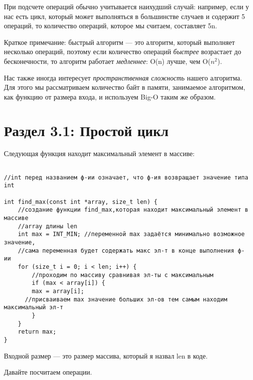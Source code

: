 \vspace{\baselineskip}
При подсчете операций обычно учитывается наихудший случай: например, если у нас есть цикл, который может выполняться в большинстве случаев и содержит 5 операций, то количество операций, которое мы считаем, составляет 5n. 

\vspace{\baselineskip}
Краткое примечание: быстрый алгоритм --- это алгоритм, который выполняет несколько операций, поэтому если количество операций \textit{быстрее} возрастает до бесконечности, то алгоритм работает \textit{медленнее}: O(n) лучше, чем O($n^{2}$).

\vspace{\baselineskip}
Нас также иногда интересует \textit{пространственная сложность} нашего алгоритма. Для этого мы рассматриваем количество байт в памяти, занимаемое алгоритмом, как функцию от размера входа, и используем Big-O таким же образом.


\section*{Раздел 3.1: Простой цикл}

Следующая функция находит максимальный элемент в массиве:

\vspace{\baselineskip}
\begin{tcolorbox}
\begin{verbatim}

//int перед названием ф-ии означает, что ф-ия возвращает значение типа int

int find_max(const int *array, size_t len) { 
	//создание функции find_max,которая находит максимальный элемент в массиве 
	//array длины len
	int max = INT_MIN; //переменной max задаётся минимально возможное значение,
	//сама переменная будет содержать макс эл-т в конце выполнения ф-ии
	for (size_t i = 0; i < len; i++) {
		//проходим по массиву сравнивая эл-ты с максимальным
		if (max < array[i]) {
		max = array[i];
	  //присваиваем max значение больших эл-ов тем самым находим максимальный эл-т
		}
	}
	return max;
}
\end{verbatim}
\end{tcolorbox}

\vspace{\baselineskip}
Входной размер --- это размер массива, который я назвал len в коде. 

\vspace{\baselineskip}
Давайте посчитаем операции.


